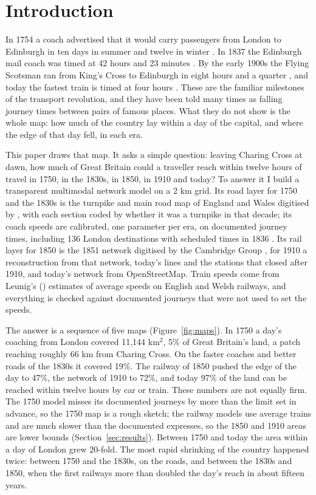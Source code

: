 \documentclass[11pt,a4paper]{article}
\begin{document}
\section{Introduction}
In 1754 a coach advertised that it would carry passengers from London to Edinburgh in ten days in summer and twelve in winter \citep{harper1922}. In 1837 the Edinburgh mail coach was timed at 42 hours and 23 minutes \citep{harper1903}. By the early 1900s the Flying Scotsman ran from King's Cross to Edinburgh in eight hours and a quarter \citep{wiki_fs}, and today the fastest train is timed at four hours \citep{visitlondon}. These are the familiar milestones of the transport revolution, and they have been told many times as falling journey times between pairs of famous places. What they do not show is the whole map: how much of the country lay within a day of the capital, and where the edge of that day fell, in each era.

This paper draws that map. It asks a simple question: leaving Charing Cross at dawn, how much of Great Britain could a traveller reach within twelve hours of travel in 1750, in the 1830s, in 1850, in 1910 and today? To answer it I build a transparent multimodal network model on a 2 km grid. Its road layer for 1750 and the 1830s is the turnpike and main road map of England and Wales digitised by \citet{rosevear2023tp}, with each section coded by whether it was a turnpike in that decade; its coach speeds are calibrated, one parameter per era, on documented journey times, including 136 London destinations with scheduled times in 1836 \citep{bates1969,rosevear2023coach}. Its rail layer for 1850 is the 1851 network digitised by the Cambridge Group \citep{satchell2023}, for 1910 a reconstruction from that network, today's lines and the stations that closed after 1910, and today's network from OpenStreetMap. Train speeds come from Leunig's (\citeyear{leunig2006}) estimates of average speeds on English and Welsh railways, and everything is checked against documented journeys that were not used to set the speeds.

The answer is a sequence of five maps (Figure~\ref{fig:maps}). In 1750 a day's coaching from London covered 11,144 km$^2$, 5\% of Great Britain's land, a patch reaching roughly 66 km from Charing Cross. On the faster coaches and better roads of the 1830s it covered 19\%. The railway of 1850 pushed the edge of the day to 47\%, the network of 1910 to 72\%, and today 97\% of the land can be reached within twelve hours by car or train. These numbers are not equally firm. The 1750 model misses its documented journeys by more than the limit set in advance, so the 1750 map is a rough sketch; the railway models use average trains and are much slower than the documented expresses, so the 1850 and 1910 areas are lower bounds (Section~\ref{sec:results}). Between 1750 and today the area within a day of London grew 20-fold. The most rapid shrinking of the country happened twice: between 1750 and the 1830s, on the roads, and between the 1830s and 1850, when the first railways more than doubled the day's reach in about fifteen years.
\end{document}
